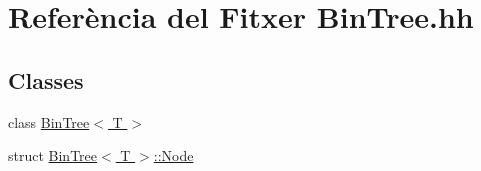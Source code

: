 \hypertarget{_bin_tree_8hh}{}\section{Referència del Fitxer Bin\+Tree.\+hh}
\label{_bin_tree_8hh}
\subsection*{Classes}
\begin{DoxyCompactItemize}
\item 
class \hyperlink{class_bin_tree}{Bin\+Tree$<$ T $>$}
\item 
struct \hyperlink{struct_bin_tree_1_1_node}{Bin\+Tree$<$ T $>$\+::\+Node}
\end{DoxyCompactItemize}

